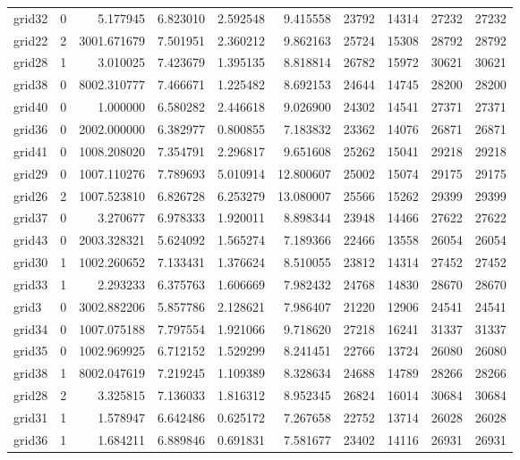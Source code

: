 \begin{longtable}{|l|r|r|r|r|r|r|r|r|r|}
grid32 & 0 & 5.177945 & 6.823010 & 2.592548 & 9.415558 & 23792 & 14314 & 27232 & 27232 \\
grid22 & 2 & 3001.671679 & 7.501951 & 2.360212 & 9.862163 & 25724 & 15308 & 28792 & 28792 \\
grid28 & 1 & 3.010025 & 7.423679 & 1.395135 & 8.818814 & 26782 & 15972 & 30621 & 30621 \\
grid38 & 0 & 8002.310777 & 7.466671 & 1.225482 & 8.692153 & 24644 & 14745 & 28200 & 28200 \\
grid40 & 0 & 1.000000 & 6.580282 & 2.446618 & 9.026900 & 24302 & 14541 & 27371 & 27371 \\
grid36 & 0 & 2002.000000 & 6.382977 & 0.800855 & 7.183832 & 23362 & 14076 & 26871 & 26871 \\
grid41 & 0 & 1008.208020 & 7.354791 & 2.296817 & 9.651608 & 25262 & 15041 & 29218 & 29218 \\
grid29 & 0 & 1007.110276 & 7.789693 & 5.010914 & 12.800607 & 25002 & 15074 & 29175 & 29175 \\
grid26 & 2 & 1007.523810 & 6.826728 & 6.253279 & 13.080007 & 25566 & 15262 & 29399 & 29399 \\
grid37 & 0 & 3.270677 & 6.978333 & 1.920011 & 8.898344 & 23948 & 14466 & 27622 & 27622 \\
grid43 & 0 & 2003.328321 & 5.624092 & 1.565274 & 7.189366 & 22466 & 13558 & 26054 & 26054 \\
grid30 & 1 & 1002.260652 & 7.133431 & 1.376624 & 8.510055 & 23812 & 14314 & 27452 & 27452 \\
grid33 & 1 & 2.293233 & 6.375763 & 1.606669 & 7.982432 & 24768 & 14830 & 28670 & 28670 \\
grid3 & 0 & 3002.882206 & 5.857786 & 2.128621 & 7.986407 & 21220 & 12906 & 24541 & 24541 \\
grid34 & 0 & 1007.075188 & 7.797554 & 1.921066 & 9.718620 & 27218 & 16241 & 31337 & 31337 \\
grid35 & 0 & 1002.969925 & 6.712152 & 1.529299 & 8.241451 & 22766 & 13724 & 26080 & 26080 \\
grid38 & 1 & 8002.047619 & 7.219245 & 1.109389 & 8.328634 & 24688 & 14789 & 28266 & 28266 \\
grid28 & 2 & 3.325815 & 7.136033 & 1.816312 & 8.952345 & 26824 & 16014 & 30684 & 30684 \\
grid31 & 1 & 1.578947 & 6.642486 & 0.625172 & 7.267658 & 22752 & 13714 & 26028 & 26028 \\
grid36 & 1 & 1.684211 & 6.889846 & 0.691831 & 7.581677 & 23402 & 14116 & 26931 & 26931 \\

\end{longtable}
